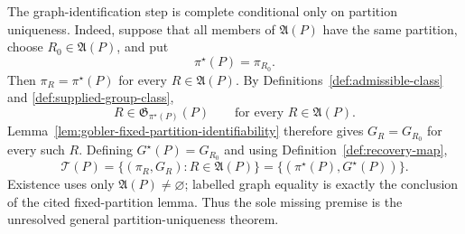 The graph-identification step is complete conditional only on partition uniqueness.  Indeed, suppose that all members of \(\mathfrak A(P)\) have the same partition, choose \(R_0\in\mathfrak A(P)\), and put
\[
 \pi^\star(P)=\pi_{R_0}.
\]
Then \(\pi_R=\pi^\star(P)\) for every \(R\in\mathfrak A(P)\).  By Definitions~\ref{def:admissible-class} and \ref{def:supplied-group-class},
\[
 R\in\mathfrak G_{\pi^\star(P)}(P)
 \qquad\text{for every }R\in\mathfrak A(P).
\]
Lemma~\ref{lem:gobler-fixed-partition-identifiability} therefore gives \(G_R=G_{R_0}\) for every such \(R\).  Defining \(G^\star(P)=G_{R_0}\) and using Definition~\ref{def:recovery-map},
\[
 \mathcal T(P)
 =\{(\pi_R,G_R):R\in\mathfrak A(P)\}
 =\{(\pi^\star(P),G^\star(P))\}.
\]
Existence uses only \(\mathfrak A(P)\ne\varnothing\); labelled graph equality is exactly the conclusion of the cited fixed-partition lemma.  Thus the sole missing premise is the unresolved general partition-uniqueness theorem.